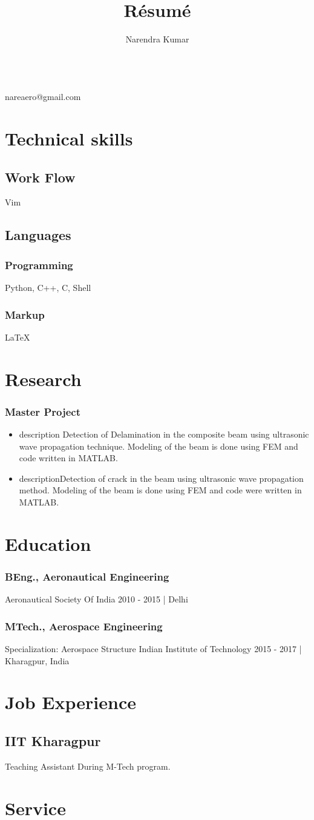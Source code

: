 \documentclass{article}
\makeatletter
\renewcommand{\maketitle}{
\begin{center}
{\huge\bfseries
	\theauthor}{}
	\vspace{0.25em}
 \\ nareaero@gmail.com
\end{center}
}
\makeatother
\begin{document}
	\pagecolor{mygray}
	
	\title{R\'esum\'e}
	\author{Narendra Kumar}
	\maketitle
	\section{Technical skills}
		\subsection{Work Flow}
		Vim
		\subsection{Languages}
		\subsubsection{Programming}
		Python, C++, C, Shell
		\subsubsection{Markup}
		{\LaTeX}
	\section{Research}
	\subsubsection{Master Project}
	\begin{itemize}
		\item[\textbf Master]{description} Detection of Delamination in the composite beam using ultrasonic
		wave propagation technique. Modeling of the beam is done using
		FEM and code written in MATLAB.
		\item[\textbf Master] descriptionDetection of crack in the beam using ultrasonic wave propagation
		method. Modeling of the beam is done using FEM and code were
		written in MATLAB.
	\end{itemize}

	\section{Education}
	\subsubsection{BEng., Aeronautical Engineering}
	Aeronautical Society Of India
	2010 - 2015 | Delhi
	\subsubsection{MTech., Aerospace Engineering}
	Specialization: Aerospace Structure
	Indian Institute of Technology
	2015 - 2017 | Kharagpur, India
	\section{Job Experience}
	\subsection{IIT Kharagpur}
	Teaching Assistant During M-Tech program.
	
	\section{Service}
\end{document}
